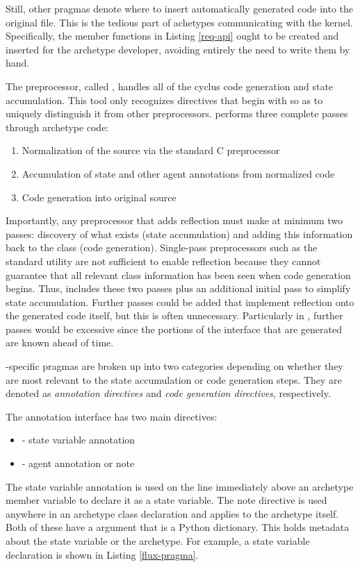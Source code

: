 Still, other pragmas denote where to insert automatically generated code into the 
original file. This is the tedious 
part of achetypes communicating with the \cyclus kernel. Specifically, 
the member functions in Listing \ref{req-api} ought to be created and inserted 
for the
archetype developer, avoiding entirely the need to write them by hand.

The \cyclus preprocessor, called \cycpp, handles all of the cyclus code generation
and state accumulation. This tool only recognizes directives that begin with  so as to uniquely distinguish it from other preprocessors.
\cycpp performs three complete passes through archetype code:
\begin{enumerate}
    \item Normalization of the source via the standard C preprocessor  
    \item Accumulation of state and other agent annotations from normalized code 
    \item Code generation into original source
\end{enumerate}
Importantly, any preprocessor that adds reflection must make at
minimum two passes: discovery of what exists (state accumulation) and adding this
information back to the class (code generation). Single-pass preprocessors such 
as the standard  utility are not sufficient to enable reflection because they 
cannot guarantee that all relevant class information has been seen when code generation begins. 
Thus, \cycpp includes these two passes plus an additional 
initial pass to simplify state accumulation. Further passes could be added that 
implement reflection onto the generated code itself, but this is often unnecessary. 
Particularly in \cyclus, further passes would be excessive since the portions of the 
 interface that are generated are known ahead of time.

\cyclus-specific pragmas are broken up into two categories depending on whether 
they are most relevant to the state accumulation or code generation steps. They 
are denoted as \emph{annotation directives} and \emph{code generation directives},
respectively.

The \cycpp annotation interface has two main directives:
\begin{itemize}
    \item {} - state variable annotation
    \item {} - agent annotation or note
\end{itemize}
The state variable annotation is used on the line immediately above an archetype
member variable to declare it as a state variable. The note directive is used
anywhere in an archetype class declaration and applies to the archetype itself.
Both of these have a  argument that is a Python dictionary. This 
holds metadata about the state variable or the archetype. For example, a 
state variable declaration is shown in Listing \ref{flux-pragma}.

